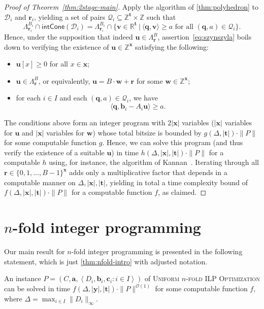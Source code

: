 \documentclass{theoretics}
\renewcommand{\geq}{\geqslant}
\newcommand{\Dd}{\mathcal{D}}
\newcommand{\Z}{\mathbb{Z}}
\newcommand{\R}{\mathbb{R}}
\newcommand{\tup}[1]{{\mathbf{#1}}}
\newcommand{\xx}{\tup x}
\newcommand{\ww}{\tup w}
\newcommand{\yy}{\tup y}
\newcommand{\tv}{\tup t}
\newcommand{\av}{\tup a}
\newcommand{\bb}{\tup b}
\newcommand{\cc}{\tup c}
\newcommand{\rr}{\tup r}
\newcommand{\qq}{\tup q}
\newcommand{\uu}{\tup u}
\newcommand{\myvv}{\tup v} %
\newcommand{\mset}[1]{\left\langle #1\right\rangle}
\newcommand{\Oh}{{\mathcal{O}}}
\newcommand{\Qq}{\mathcal{Q}}
\newcommand{\sca}[2]{\langle #1,#2\rangle}
\newcommand{\nfoldOpt}{\textsc{$n$-fold ILP Optimization}}
\newcommand{\nfold}{$n$-fold}
\newcommand{\intcone}{\mathsf{intCone}}
\begin{document}
\begin{proof}[Proof of Theorem~\ref{thm:2stage-main}]
 Apply the algorithm of \cref{thm:polyhedron} to $\Dd_i$ and $\rr_i$, yielding a set of pairs $\Qq_i\subseteq \Z^\tv\times \Z$ such that
 $$\Lambda^{B_i}_{\rr_i}\cap \intcone(\Dd_i) = \Lambda^{B_i}_{\rr_i}\cap \{\myvv\in \R^\tv~|~\sca{\qq}{\myvv}\geq a\textrm{ for all }(\qq,a)\in \Qq_i\}.$$
 Hence, under the supposition that indeed $\uu\in \Lambda_\rr^B$, assertion~\cref{eq:szynszyla} boils down to verifying the existence of $\uu\in \Z^{\xx}$ satisfying the following:
 \begin{itemize}[nosep]
  \item $\uu[x]\geq 0$ for all $x\in \xx$;
  \item $\uu\in \Lambda_\rr^B$, or equivalently, $\uu=B\cdot \ww+\rr$ for some $\ww\in \Z^\xx$;
  \item for each $i\in I$ and each $(\qq,a)\in \Qq_i$, we have
  $$\sca{\qq}{\bb_i-A_i\uu}\geq a.$$
 \end{itemize}
 The conditions above form an integer program with $2|\xx|$ variables ($|\xx|$ variables for $\uu$ and $|\xx|$ variables for $\ww$) whose total bitsize is bounded by $g(\Delta,|\tv|)\cdot \|P\|$ for some computable function $g$. Hence, we can solve this program (and thus verify the existence of a suitable $\uu$) in time $h(\Delta,|\xx|,|\tv|)\cdot \|P\|$ for a computable $h$ using, for instance, the algorithm of Kannan~\cite{kannan1987minkowski}. Iterating through all $\rr\in \{0,1,\ldots,B-1\}^\xx$ adds only a multiplicative factor that depends in a computable manner on $\Delta,|\xx|,|\tv|$, yielding in total a time complexity bound of $f(\Delta,|\xx|,|\tv|)\cdot \|P\|$ for a computable function $f$, as claimed.
\end{proof}

\section{\texorpdfstring{\nfold{}}{n-fold} integer programming}

Our main result for \nfold{} integer programming is presented in the following statement, which is just \cref{thm:nfold-intro} with adjusted notation.

\begin{theorem}\label{thm:nfold-main}
An instance $P=(C,\av,\mset{D_i,\bb_i,\cc_i\colon i\in I})$ of {\textsc{Uniform}} \nfoldOpt{} can be solved in time $f(\Delta,|\yy|,|\tv|)\cdot \|P\|^{\Oh(1)}$ for some computable function $f$, where $\Delta=\max_{i\in I}\|D_i\|_\infty$.
\end{theorem}
\end{document}
